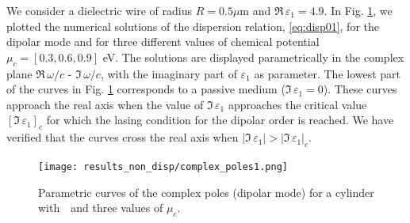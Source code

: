 \documentclass[9pt,twocolumn,twoside]{osajnl}
\begin{document}
We consider a dielectric wire of radius $R=0.5\mu$m and $\Re\,\varepsilon_1=4.9$.
In Fig. \ref{fig complex poles non disp}, we plotted the numerical solutions of the dispersion relation, \eqref{eq:disp01}, for the dipolar mode and for three different values of chemical potential $\mu_c = [0.3,0.6,0.9]$ eV. The solutions are displayed parametrically in the complex plane $\Re\,\omega/c$ - $\Im\,\omega/c$, with the imaginary part of $\varepsilon_1$ as parameter. The lowest part of the curves in Fig. \ref{fig complex poles non disp} corresponds to a passive medium ($\Im\,\varepsilon_1= 0$). These curves approach the real axis when the value of $\Im\,\varepsilon_1$ approaches the  critical value $[\Im\,\varepsilon_{1}]_c$ for which the lasing condition for the dipolar order is reached. We have verified that the curves cross the real axis when $|\Im\,\varepsilon_1|> |\Im\,\varepsilon_{1}|_c$. 
%
\begin{figure}[H]
\centering
\texttt{[image: results\_non\_disp/complex\_poles1.png]}
\caption{Parametric curves of the complex poles (dipolar mode) for a cylinder with  \oneNonDisp $\,\,$ and three values of $\mu_c$.} \label{fig complex poles non disp}
\end{figure}
%
%
%
%
\end{document}
